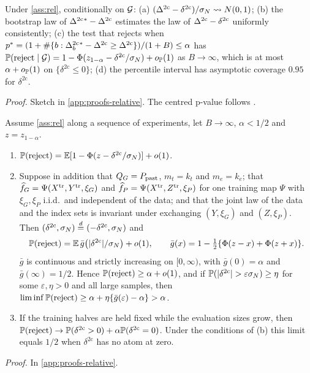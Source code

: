\begin{proposition}\label{prop:paired-boot}
Under \cref{ass:rel}, conditionally on $\mathcal{G}$: (a) $(\Delta^{\mathrm{2c}}-\delta^{\mathrm{2c}})/\sigma_N\rightsquigarrow N(0,1)$;
(b) the bootstrap law of $\Delta^{\mathrm{2c}}{}^*-\Delta^{\mathrm{2c}}$ estimates the law of $\Delta^{\mathrm{2c}}-\delta^{\mathrm{2c}}$
uniformly consistently; (c) the test that rejects when
$p^*=(1+\#\{b:\Delta^{\mathrm{2c}}_b{}^*-\Delta^{\mathrm{2c}}\ge\Delta^{\mathrm{2c}}\})/(1+B)\le\alpha$ has
$\mathbb{P}(\text{reject}\mid\mathcal{G})=1-\Phi(z_{1-\alpha}-\delta^{\mathrm{2c}}/\sigma_N)+o_{\mathbb{P}}(1)$ as
$B\to\infty$, which is at most $\alpha+o_{\mathbb{P}}(1)$ on $\{\delta^{\mathrm{2c}}\le0\}$; (d) the
percentile interval has asymptotic coverage $0.95$ for $\delta^{\mathrm{2c}}$.
\end{proposition}
\noindent\textit{Proof.} Sketch in \cref{app:proofs-relative}. The centred p-value follows
\citet{hall1991two}.

\begin{proposition}
\label{prop:boundary-size}
Assume \cref{ass:rel} along a sequence of experiments, let $B\to\infty$, $\alpha<1/2$ and
$z=z_{1-\alpha}$.
\begin{enumerate}
  \item[(a)] $\mathbb{P}(\text{reject})=\mathbb{E}[1-\Phi(z-\delta^{\mathrm{2c}}/\sigma_N)]+o(1)$.
  \item[(b)] Suppose in addition that $Q_{G}=P_{\mathrm{past}}$, $m_t=k_t$ and $m_e=k_e$; that
  $\widehat{f}_G=\Psi(X^{\mathrm{tr}},Y^{\mathrm{tr}},\xi_G)$ and $\widehat{f}_P=\Psi(X^{\mathrm{tr}},Z^{\mathrm{tr}},\xi_P)$ for one
  training map $\Psi$ with $\xi_G,\xi_P$ i.i.d.\ and independent of the data; and that the joint
  law of the data and the index sets is invariant under exchanging $(Y,\xi_G)$ and $(Z,\xi_P)$.
  Then $(\delta^{\mathrm{2c}},\sigma_N)\overset{d}{=}(-\delta^{\mathrm{2c}},\sigma_N)$ and
  \[
    \mathbb{P}(\text{reject})=\mathbb{E}\,\bar g\big(\lvert\delta^{\mathrm{2c}}\rvert/\sigma_N\big)+o(1),\qquad
    \bar g(x)=1-\tfrac12\{\Phi(z-x)+\Phi(z+x)\}.
  \]
  $\bar g$ is continuous and strictly increasing on $[0,\infty)$, with $\bar g(0)=\alpha$ and
  $\bar g(\infty)=1/2$. Hence $\mathbb{P}(\text{reject})\ge\alpha+o(1)$, and if
  $\mathbb{P}(\lvert\delta^{\mathrm{2c}}\rvert>\varepsilon\sigma_N)\ge\eta$ for some $\varepsilon,\eta>0$ and
  all large samples, then $\liminf\mathbb{P}(\text{reject})\ge\alpha+\eta\{\bar g(\varepsilon)-\alpha\}>\alpha$.
  \item[(c)] If the training halves are held fixed while the evaluation sizes grow, then
  $\mathbb{P}(\text{reject})\to\mathbb{P}(\delta^{\mathrm{2c}}>0)+\alpha\mathbb{P}(\delta^{\mathrm{2c}}=0)$. Under
  the conditions of (b) this limit equals $1/2$ when $\delta^{\mathrm{2c}}$ has no atom at zero.
\end{enumerate}
\end{proposition}
\noindent\textit{Proof.} In \cref{app:proofs-relative}.

